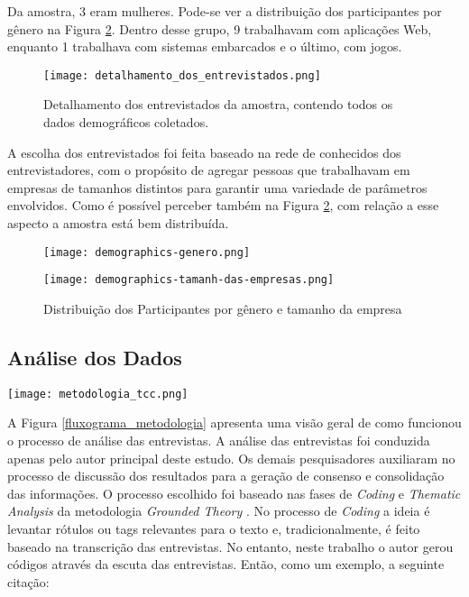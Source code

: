 Da amostra, 3 eram mulheres. Pode-se ver a distribuição dos participantes por gênero na Figura \ref{genero_e_tamanho}. Dentro desse grupo, 9 trabalhavam com aplicações Web, enquanto 1 trabalhava com sistemas embarcados e o último, com jogos.

\begin{figure}[h]
\centering
\texttt{[image: detalhamento\_dos\_entrevistados.png]}
\caption{Detalhamento dos entrevistados da amostra, contendo todos os dados demográficos coletados.}
\label{detalhamento_dos_entrevistados}
\end{figure}


A escolha dos entrevistados foi feita baseado na rede de conhecidos dos entrevistadores, com o propósito de agregar pessoas que trabalhavam em empresas de tamanhos distintos para garantir uma variedade de parâmetros envolvidos. Como é possível perceber também na Figura \ref{genero_e_tamanho}, com relação a esse aspecto a amostra está bem distribuída. 

\begin{figure}
\begin{minipage}{.21\textwidth}
    \centering
    \texttt{[image: demographics-genero.png]}
\end{minipage}%
\begin{minipage}{.25\textwidth}
    \centering
    \texttt{[image: demographics-tamanh-das-empresas.png]}
\end{minipage}
\caption{
    Distribuição dos Participantes por gênero e tamanho da empresa
    }
    \label{genero_e_tamanho}
\end{figure}

\subsection{Análise dos Dados}

\begin{figure*}[ht]
\begin{center}
\texttt{[image: metodologia\_tcc.png]}
\end{center}
\caption[Fluxograma da Metodologia]{
    Visão geral dos processos de coleta e análise de dados.
}\label{fluxograma_metodologia}
\end{figure*}

    
A Figura \ref{fluxograma_metodologia} apresenta uma visão geral de como funcionou o processo de análise das entrevistas. A análise das entrevistas foi conduzida apenas pelo autor principal deste estudo. Os demais pesquisadores auxiliaram no processo de discussão dos resultados para a geração de consenso e consolidação das informações. O processo escolhido foi baseado nas fases de \emph{Coding} e \emph{Thematic Analysis} da metodologia \emph{Grounded Theory} \cite{groundedTheory}. No processo de \emph{Coding} a ideia é levantar rótulos ou tags relevantes para o texto e, tradicionalmente, é feito baseado na transcrição das entrevistas. No entanto, neste trabalho o autor gerou códigos através da escuta das entrevistas. Então, como um exemplo, a seguinte citação:

